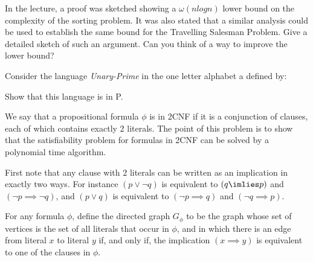 \documentclass{supervision}
\begin{document}
  \begin{questions}
    \question In the lecture, a proof was sketched showing a $\omega(n log n)$
      lower bound on the complexity of the sorting problem. It was also stated
      that a similar analysis could be used to establish the same bound for the
      Travelling Salesman Problem. Give a detailed sketch of such an argument.
      Can you think of a way to improve the lower bound?

    \question Consider the language \emph{Unary-Prime} in the one letter
      alphabet {a} defined by:


      Show that this language is in P.

    \question We say that a propositional formula $\phi$ is in 2CNF if it is a
      conjunction of clauses, each of which contains exactly 2 literals. The
      point of this problem is to show that the satisfiability problem for
      formulas in 2CNF can be solved by a polynomial time algorithm.

      First note that any clause with 2 literals can be written as an
      implication in exactly two ways. For instance $(p \lor \lnot q)$ is
      equivalent to $(q \imlies p)$ and $(\lnot p \implies \lnot q)$, and
      $(p \lor q)$ is equivalent to $(\lnot p \implies q)$ and $(\lnot q
      \implies p)$.

      For any formula $\phi$, define the directed graph $G_\phi$ to be the
      graph whose set of vertices is the set of all literals that occur in
      $\phi$, and in which there is an edge from literal $x$ to literal $y$ if,
      and only if, the implication $(x \implies y)$ is equivalent to one of the
      clauses in $\phi$.

\end{questions}
\end{document}
